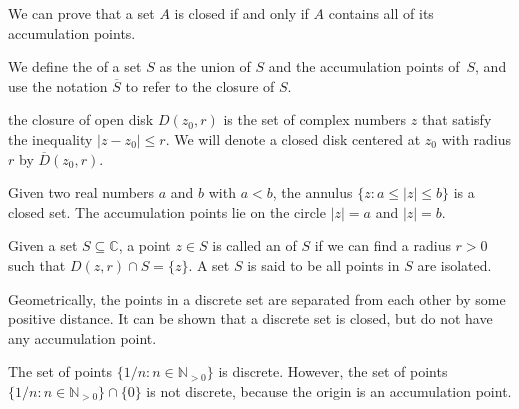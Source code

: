 We can prove that a set $A$ is closed if and only if $A$ contains all of its accumulation points. 

\begin{svgraybox}
	\begin{definition}
We define the  of a set $S$ as the union of $S$ and the accumulation points of~$S$, and use the notation $\overline{S}$ to refer to the closure of $S$.
	\end{definition}
\end{svgraybox}



\begin{example} the closure of open disk $D(z_0,r)$ is the set of complex numbers $z$ that satisfy the inequality $|z-z_0|\leq r$. We will denote a closed disk centered at $z_0$ with radius $r$ by $\overline{D}(z_0,r)$. 
\end{example} 


\begin{example}
Given two real numbers $a$ and $b$ with $a<b$, the annulus $\{z: a\leq |z| \leq b\}$ is a closed set. The accumulation points lie on the circle $|z|=a$ and $|z|=b$.
\end{example}

 
\begin{svgraybox}
	\begin{definition} \label{def:discrete_set} 
Given a set $S\subseteq \mathbb{C}$, a point $z\in S$ is called an  of $S$ if we can find a radius $r>0$ such that $D(z,r)\cap S = \{z\}$. A set $S$ is said to be  all points in $S$ are isolated.
	\end{definition}
\end{svgraybox}


Geometrically, the points in a discrete set are separated from each other by some positive distance. It can be shown that a discrete set is closed, but do not have any accumulation point.

\begin{example}
	The set of points 
	$\{1/n: n\in \mathbb{N}_{>0}\}$ is discrete. However, the set of points
	$\{1/n: n\in \mathbb{N}_{> 0}\} \cap \{0\}$ is not discrete, because the origin is an accumulation point.
\end{example}

